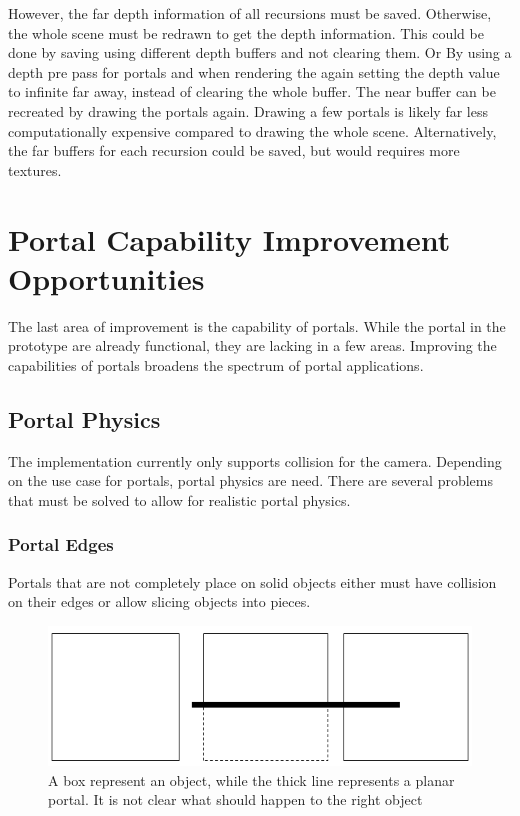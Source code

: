 However, the far depth information of all recursions must be saved. Otherwise, the whole scene must be redrawn to get the depth information. This could be done by saving using different depth buffers and not clearing them. Or By using a depth pre pass for portals and when rendering the again setting the depth value to infinite far away, instead of clearing the whole buffer. The near buffer can be recreated by drawing the portals again. Drawing a few portals is likely far less computationally expensive compared to drawing the whole scene. Alternatively, the far buffers for each recursion could be saved, but would requires more textures.


\chapter{Portal Capability Improvement Opportunities}
The last area of improvement is the capability of portals. While the portal in the prototype are already functional, they are lacking in a few areas. Improving the capabilities of portals broadens the spectrum of portal applications. 


\section{Portal Physics}
\label{section:portalphysics}
The implementation currently only supports collision for the camera. Depending on the use case for portals, portal physics are need. There are several problems that must be solved to allow for realistic portal physics.

\subsection{Portal Edges}
Portals that are not completely place on solid objects either must have collision on their edges or allow slicing objects into pieces.

\begin{figure}[h]
	\centering
	\includegraphics[width=\linewidth]{images/edgecollision.png}
	\caption{A box represent an object, while the thick line represents a planar portal. It is not clear what should happen to the right object}
	\label{fig:edgecollision}
\end{figure}

